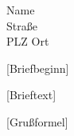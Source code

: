 \documentclass{tubslttr2}
\begin{document}
\begin{letter}{%
Name\\
Straße\\
PLZ Ort
}
\opening{[Briefbeginn]}
[Brieftext]
\closing{[Grußformel]}

\end{letter}
\end{document}
